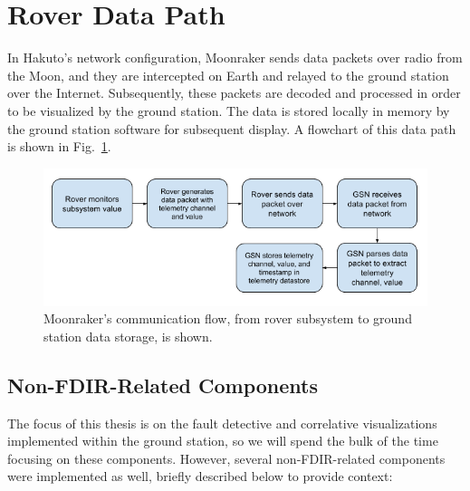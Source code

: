 \section{Rover Data Path}

In Hakuto's network configuration, Moonraker sends data packets over radio from the Moon, and they are intercepted on Earth and relayed to the ground station over the Internet. Subsequently, these packets are decoded and processed in order to be visualized by the ground station. The data is stored locally in memory by the ground station software for subsequent display. A flowchart of this data path is shown in Fig.~\ref{fig:data_path}.

\begin{figure}[h]
\centering
    \includegraphics[width=\columnwidth]{images/rover_data_flow.png}
    \caption{Moonraker's communication flow, from rover subsystem to ground station data storage, is shown.}
    \label{fig:data_path}
\end{figure}

\subsection{Non-FDIR-Related Components}

The focus of this thesis is on the fault detective and correlative visualizations implemented within the ground station, so we will spend the bulk of the time focusing on these components. However, several non-FDIR-related components were implemented as well, briefly described below to provide context:

